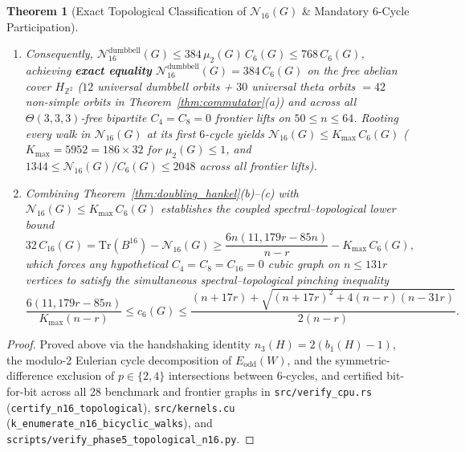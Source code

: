 \documentclass[10pt,a4paper]{article}
\newtheorem{theorem}{Theorem}[section]
\theoremstyle{definition}
\theoremstyle{remark}
\begin{document}
\begin{theorem}[Exact Topological Classification of $\mathcal{N}_{16}(G)$ \& Mandatory $6$-Cycle Participation]
\begin{enumerate}[label=(\alph*),nosep]
\begin{enumerate}[label=(\roman*),nosep]
    \item Consequently, $\mathcal{N}_{16}^{\mathrm{dumbbell}}(G) \le 384\,\mu_2(G)\,C_6(G) \le 768\,C_6(G)$, achieving \textbf{exact equality} $\mathcal{N}_{16}^{\mathrm{dumbbell}}(G) = 384\,C_6(G)$ on the free abelian cover $H_{\mathbb{Z}^2}$ ($12$ universal dumbbell orbits + $30$ universal theta orbits $= 42$ non-simple orbits in Theorem~\ref{thm:commutator}(a)) and across all $\Theta(3,3,3)$-free bipartite $C_4=C_8=0$ frontier lifts on $50 \le n \le 64$. Rooting every walk in $\mathcal{N}_{16}(G)$ at its first $6$-cycle yields $\mathcal{N}_{16}(G) \le K_{\max}\,C_6(G)$ ($K_{\max} = 5952 = 186 \times 32$ for $\mu_2(G) \le 1$, and $1344 \le \mathcal{N}_{16}(G)/C_6(G) \le 2048$ across all frontier lifts).
    \item Combining Theorem~\ref{thm:doubling_hankel}(b)--(c) with $\mathcal{N}_{16}(G) \le K_{\max}\,C_6(G)$ establishes the coupled spectral--topological lower bound
    \begin{equation}\label{eq:coupled_c16}
      32\,C_{16}(G) = \mathrm{Tr}(B^{16}) - \mathcal{N}_{16}(G) \ge \frac{6n(11{,}179 r - 85n)}{n - r} - K_{\max}\,C_6(G),
    \end{equation}
    which forces any hypothetical $C_4 = C_8 = C_{16} = 0$ cubic graph on $n \le 131 r$ vertices to satisfy the simultaneous spectral--topological pinching inequality
    \begin{equation}\label{eq:pinching}
      \frac{6(11{,}179 r - 85n)}{K_{\max}(n - r)} \le c_6(G) \le \frac{(n + 17 r) + \sqrt{(n + 17 r)^2 + 4(n - r)(n - 31 r)}}{2(n - r)}.
    \end{equation}
  \end{enumerate}
\end{enumerate}
\end{theorem}

\begin{proof}
Proved above via the handshaking identity $n_3(H) = 2(b_1(H)-1)$, the modulo-2 Eulerian cycle decomposition of $E_{\mathrm{odd}}(W)$, and the symmetric-difference exclusion of $p \in \{2, 4\}$ intersections between $6$-cycles, and certified bit-for-bit across all 28 benchmark and frontier graphs in \texttt{src/verify\_cpu.rs} (\texttt{certify\_n16\_topological}), \texttt{src/kernels.cu} (\texttt{k\_enumerate\_n16\_bicyclic\_walks}), and \texttt{scripts/verify\_phase5\_topological\_n16.py}.
\end{proof}
\end{document}
